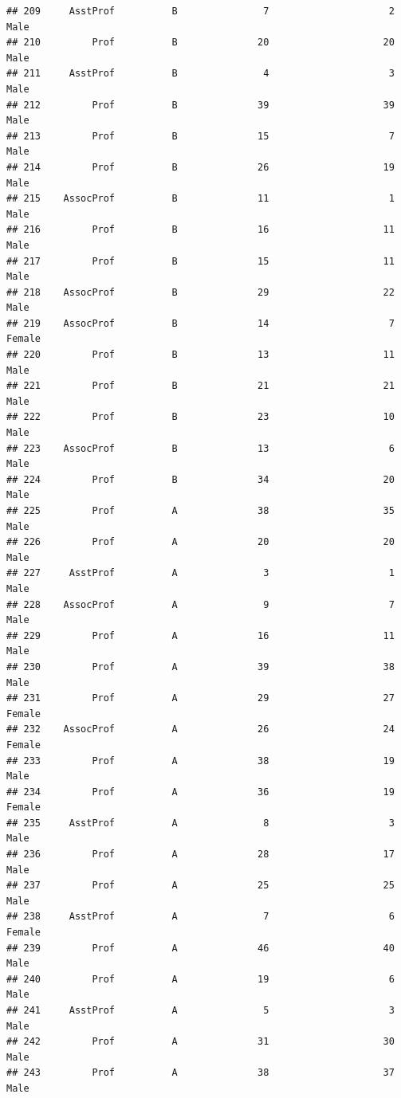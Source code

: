 \documentclass[]{article}
\begin{document}
\begin{verbatim}
## 209     AsstProf          B               7                     2   Male
## 210         Prof          B              20                    20   Male
## 211     AsstProf          B               4                     3   Male
## 212         Prof          B              39                    39   Male
## 213         Prof          B              15                     7   Male
## 214         Prof          B              26                    19   Male
## 215    AssocProf          B              11                     1   Male
## 216         Prof          B              16                    11   Male
## 217         Prof          B              15                    11   Male
## 218    AssocProf          B              29                    22   Male
## 219    AssocProf          B              14                     7 Female
## 220         Prof          B              13                    11   Male
## 221         Prof          B              21                    21   Male
## 222         Prof          B              23                    10   Male
## 223    AssocProf          B              13                     6   Male
## 224         Prof          B              34                    20   Male
## 225         Prof          A              38                    35   Male
## 226         Prof          A              20                    20   Male
## 227     AsstProf          A               3                     1   Male
## 228    AssocProf          A               9                     7   Male
## 229         Prof          A              16                    11   Male
## 230         Prof          A              39                    38   Male
## 231         Prof          A              29                    27 Female
## 232    AssocProf          A              26                    24 Female
## 233         Prof          A              38                    19   Male
## 234         Prof          A              36                    19 Female
## 235     AsstProf          A               8                     3   Male
## 236         Prof          A              28                    17   Male
## 237         Prof          A              25                    25   Male
## 238     AsstProf          A               7                     6 Female
## 239         Prof          A              46                    40   Male
## 240         Prof          A              19                     6   Male
## 241     AsstProf          A               5                     3   Male
## 242         Prof          A              31                    30   Male
## 243         Prof          A              38                    37   Male

\end{verbatim}
\end{document}

